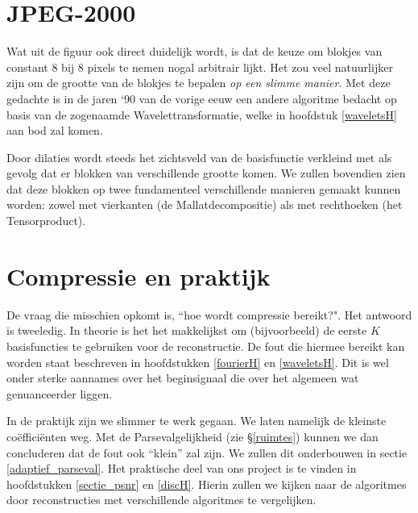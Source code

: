 \documentclass[11pt]{uvamath}
\theoremstyle{plain}
\theoremstyle{definition}
\theoremstyle{remark}
\begin{document}
\section*{JPEG-2000}
Wat uit de figuur ook direct duidelijk wordt, is dat de keuze om blokjes van constant 8 bij 8 pixels te nemen nogal arbitrair lijkt. Het zou veel natuurlijker zijn om de grootte van de blokjes te bepalen \emph{op een slimme manier}. Met deze gedachte is in de jaren `90 van de vorige eeuw een andere algoritme bedacht op basis van de zogenaamde Wavelettransformatie, welke in hoofdstuk \ref{waveletsH} aan bod zal komen. 

Door dilaties wordt steeds het zichtsveld van de basisfunctie verkleind met als gevolg dat er blokken van verschillende grootte komen. We zullen bovendien zien dat deze blokken op twee fundamenteel verschillende manieren gemaakt kunnen worden: zowel met vierkanten (de Mallatdecompositie) als met rechthoeken (het Tensorproduct).

\section*{Compressie en praktijk}
De vraag die misschien opkomt is, ``hoe wordt compressie bereikt?". Het antwoord is tweeledig. In theorie is het het makkelijkst om (bijvoorbeeld) de eerste $K$ basisfuncties te gebruiken voor de reconstructie. De fout die hiermee bereikt kan worden staat beschreven in hoofdstukken \ref{fourierH} en \ref{waveletsH}. Dit is wel onder sterke aannames over het beginsignaal die over het algemeen wat genuanceerder liggen.

In de praktijk zijn we slimmer te werk gegaan. We laten namelijk de kleinste co\"effici\"enten weg. Met de Parsevalgelijkheid (zie \S \ref{ruimtes}) kunnen we dan concluderen dat de fout ook ``klein'' zal zijn. 
We zullen dit onderbouwen in sectie \ref{adaptief_parseval}.
Het praktische deel van ons project is te vinden in hoofdstukken \ref{sectie_psnr} en \ref{discH}. Hierin zullen we kijken naar de algoritmes door reconstructies met verschillende algoritmes te vergelijken.
\end{document}
